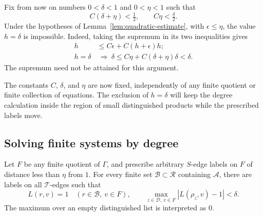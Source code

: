 Fix from now on numbers $0<\delta<1$ and $0<\eta<1$ such that
\begin{equation}\label{eq:small-thresholds}
 C(\delta+\eta)<\tfrac12,
 \qquad C\eta<\tfrac{\delta}{2}.
\end{equation}
Under the hypotheses of Lemma~\ref{lem:quadratic-estimate}, with
$\epsilon\le\eta$, the value $h=\delta$ is impossible.  Indeed, taking
the supremum in its two inequalities gives
\begin{equation}\label{eq:no-threshold-crossing}
 \begin{aligned}
 h&\le C\epsilon+C(h+\epsilon)h;\\
 h=\delta&\ \Longrightarrow\
 \delta\le C\eta+C(\delta+\eta)\delta<\delta.
 \end{aligned}
\end{equation}
The supremum need not be attained for this argument.

The constants $C$, $\delta$, and $\eta$ are now fixed, independently of
any finite quotient or finite collection of equations. The exclusion of
$h=\delta$ will keep the degree calculation inside the region of small
distinguished products while the prescribed labels move.

\subsection{Solving finite systems by degree}

\begin{lemma}\label{lem:finite-quotient-solvability}
Let $F$ be any finite quotient of $\Gamma$, and prescribe arbitrary
$S$-edge labels on $F$ of distance less than $\eta$ from $1$.
For every finite set $\mathcal B\subset\mathcal R$ containing
$\mathcal A$, there are labels on all $\mathcal T$-edges such that
\[
 L(r,v)=1\quad(r\in\mathcal B,\ v\in F),
 \qquad
 \max_{z\in\mathcal D,\ v\in F}|L(\rho_z,v)-1|<\delta.
\]
The maximum over an empty distinguished list is interpreted as $0$.
\end{lemma}

